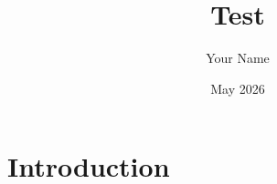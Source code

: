 \documentclass{article}
\title{Test}
\author{Your Name}
\date{May 2026}
\begin{document}
\maketitle

\section{Introduction}
\end{document}
